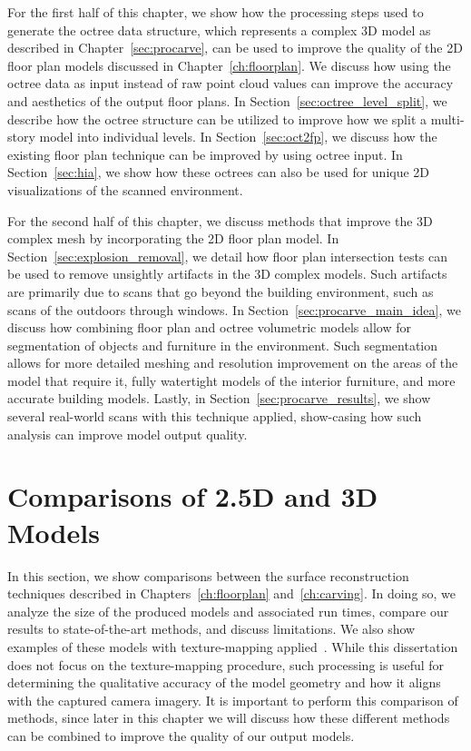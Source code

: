 \documentclass[12pt,onecolumn,oneside]{book}
\begin{document}
For the first half of this chapter, we show how the processing steps used to generate the octree data structure, which represents a complex 3D model as described in Chapter~\ref{sec:procarve}, can be used to improve the quality of the 2D floor plan models discussed in Chapter~\ref{ch:floorplan}.  We discuss how using the octree data as input instead of raw point cloud values can improve the accuracy and aesthetics of the output floor plans.  In Section~\ref{sec:octree_level_split}, we describe how the octree structure can be utilized to improve how we split a multi-story model into individual levels.  In Section~\ref{sec:oct2fp}, we discuss how the existing floor plan technique can be improved by using octree input.  In Section~\ref{sec:hia}, we show how these octrees can also be used for unique 2D visualizations of the scanned environment.

For the second half of this chapter, we discuss methods that improve the 3D complex mesh by incorporating the 2D floor plan model.  In Section~\ref{sec:explosion_removal}, we detail how floor plan intersection tests can be used to remove unsightly artifacts in the 3D complex models.  Such artifacts are primarily due to scans that go beyond the building environment, such as scans of the outdoors through windows.  In Section~\ref{sec:procarve_main_idea}, we discuss how combining floor plan and octree volumetric models allow for segmentation of objects and furniture in the environment.  Such segmentation allows for more detailed meshing and resolution improvement on the areas of the model that require it, fully watertight models of the interior furniture, and more accurate building models.  Lastly, in Section~\ref{sec:procarve_results}, we show several real-world scans with this technique applied, show-casing how such analysis can improve model output quality.

\section{Comparisons of 2.5D and 3D Models}
\label{sec:fp_carving_compare}

In this section, we show comparisons between the surface reconstruction techniques described in Chapters~\ref{ch:floorplan} and~\ref{ch:carving}.  In doing so, we analyze the size of the produced models and associated run times, compare our results to state-of-the-art methods, and discuss limitations.  We also show examples of these models with texture-mapping applied~\cite{Cheng14,Turner14Journal}.  While this dissertation does not focus on the texture-mapping procedure, such processing is useful for determining the qualitative accuracy of the model geometry and how it aligns with the captured camera imagery.  It is important to perform this comparison of methods, since later in this chapter we will discuss how these different methods can be combined to improve the quality of our output models.
\end{document}
